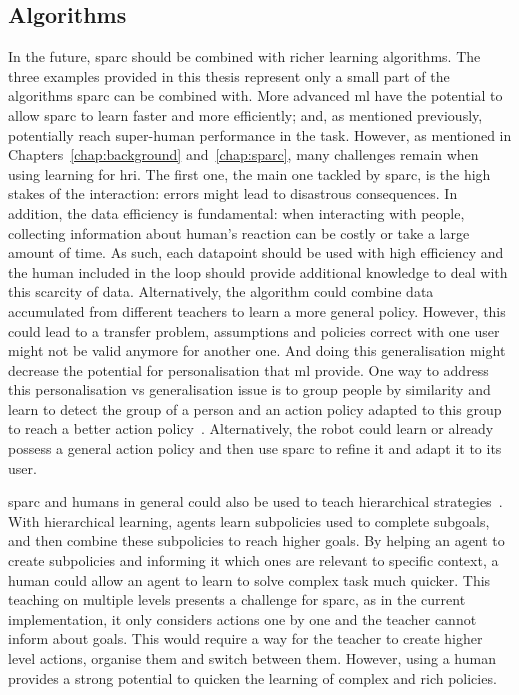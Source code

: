 \subsection{Algorithms}

In the future, \gls{sparc} should be combined with richer learning algorithms. The three examples provided in this thesis represent only a small part of the algorithms \gls{sparc} can be combined with. More advanced \gls{ml} have the potential to allow \gls{sparc} to learn faster and more efficiently; and, as mentioned previously, potentially reach super-human performance in the task. However, as mentioned in Chapters~\ref{chap:background} and~\ref{chap:sparc}, many challenges remain when using learning for \gls{hri}. The first one, the main one tackled by \gls{sparc}, is the high stakes of the interaction: errors might lead to disastrous consequences. In addition, the data efficiency is fundamental: when interacting with people, collecting information about human's reaction can be costly or take a large amount of time. As such, each datapoint should be used with high efficiency and the human included in the loop should provide additional knowledge to deal with this scarcity of data. Alternatively, the algorithm could combine data accumulated from different teachers to learn a more general policy. However, this could lead to a transfer problem, assumptions and policies correct with one user might not be valid anymore for another one. And doing this generalisation might decrease the potential for personalisation that \gls{ml} provide. One way to address this personalisation vs generalisation issue is to group people by similarity and learn to detect the group of a person and an action policy adapted to this group to reach a better action policy~\citep{brunskill2014pac}. Alternatively, the robot could learn or already possess a general action policy and then use \gls{sparc} to refine it and adapt it to its user. 

\gls{sparc} and humans in general could also be used to teach hierarchical strategies~\citep{botvinick2012hierarchical}. With hierarchical learning, agents learn subpolicies used to complete subgoals, and then combine these subpolicies to reach higher goals. By helping an agent to create subpolicies and informing it which ones are relevant to specific context, a human could allow an agent to learn to solve complex task much quicker. This teaching on multiple levels presents a challenge for \gls{sparc}, as in the current implementation, it only considers actions one by one and the teacher cannot inform about goals. This would require a way for the teacher to create higher level actions, organise them and switch between them. However, using a human provides a strong potential to quicken the learning of complex and rich policies.

